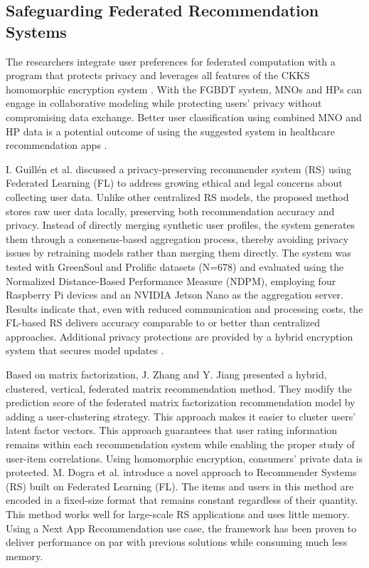 \subsection{Safeguarding Federated Recommendation Systems}
The researchers integrate user preferences for federated computation with a program that protects privacy and leverages all features of the CKKS homomorphic encryption system \cite{ref34}. With the FGBDT system, MNOs and HPs can engage in collaborative modeling while protecting users' privacy without compromising data exchange. Better user classification using combined MNO and HP data is a potential outcome of using the suggested system in healthcare recommendation apps \cite{ref35}.

I. Guillén et al. discussed a privacy-preserving recommender system (RS) using Federated Learning (FL) to address growing ethical and legal concerns about collecting user data. Unlike other centralized RS models, the proposed method stores raw user data locally, preserving both recommendation accuracy and privacy. Instead of directly merging synthetic user profiles, the system generates them through a consensus-based aggregation process, thereby avoiding privacy issues by retraining models rather than merging them directly. The system was tested with GreenSoul and Prolific datasets (N=678) and evaluated using the Normalized Distance-Based Performance Measure (NDPM), employing four Raspberry Pi devices and an NVIDIA Jetson Nano as the aggregation server. Results indicate that, even with reduced communication and processing costs, the FL-based RS delivers accuracy comparable to or better than centralized approaches. Additional privacy protections are provided by a hybrid encryption system that secures model updates \cite{ref2}.

Based on matrix factorization, J. Zhang and Y. Jiang \cite{ref35} presented a hybrid, clustered, vertical, federated matrix recommendation method. They modify the prediction score of the federated matrix factorization recommendation model by adding a user-clustering strategy. This approach makes it easier to cluster users' latent factor vectors. This approach guarantees that user rating information remains within each recommendation system while enabling the proper study of user-item correlations. Using homomorphic encryption, consumers' private data is protected. M. Dogra et al. introduce a novel approach to Recommender Systems (RS) built on Federated Learning (FL). The items and users in this method are encoded in a fixed-size format that remains constant regardless of their quantity. This method works well for large-scale RS applications and uses little memory. Using a Next App Recommendation use case, the framework has been proven to deliver performance on par with previous solutions while consuming much less memory\cite{ref36}.


